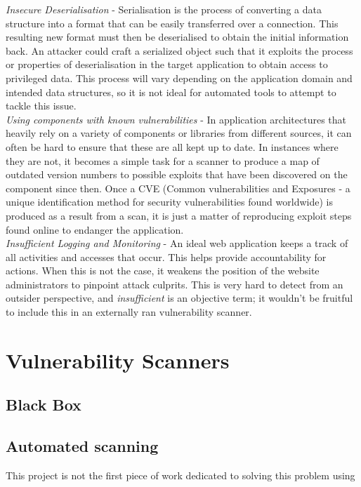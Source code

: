 	\emph{Insecure Deserialisation} - Serialisation is the process of converting a data structure into a format that can be easily transferred over a connection. This resulting new format must then be deserialised to obtain the initial information back. An attacker could craft a serialized object such that it exploits the process or properties of deserialisation in the target application to obtain access to privileged data. This process will vary depending on the application domain and intended data structures, so it is not ideal for automated tools to attempt to tackle this issue. \\ 
	
	\emph{Using components with known vulnerabilities} - In application architectures that heavily rely on a variety of components or libraries from different sources, it can often be hard to ensure that these are all kept up to date. In instances where they are not, it becomes a simple task for a scanner to produce a map of outdated version numbers to possible exploits that have been discovered on the component since then. Once a CVE (Common vulnerabilities and Exposures - a unique identification method for security vulnerabilities found worldwide) is produced as a result from a scan, it is just a matter of reproducing exploit steps found online to endanger the application. \\ 
	
	\emph{Insufficient Logging and Monitoring} - An ideal web application keeps a track of all activities and accesses that occur. This helps provide accountability for actions. When this is not the case, it weakens the position of the website administrators to pinpoint attack culprits. This is very hard to detect from an outsider perspective, and \textit{insufficient} is an objective term; it wouldn't be fruitful to include this in an externally ran vulnerability scanner. \\


\section{Vulnerability Scanners}

\subsection{Black Box}

\subsection{Automated scanning}
This project is not the first piece of work dedicated to solving this problem using 

